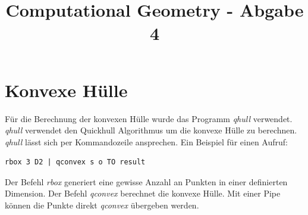 \documentclass[conference]{IEEEtran}
\begin{document}
	
	\title{Computational Geometry - Abgabe 4}
	
	\author{
	}
	
	\maketitle
	

	\section{Konvexe Hülle}
	Für die Berechnung der konvexen Hülle wurde das Programm \textit{qhull} \cite{b2} verwendet. \textit{qhull} verwendet den Quickhull Algorithmus um die konvexe Hülle zu berechnen. \textit{qhull} lässt sich per Kommandozeile ansprechen. Ein Beispiel für einen Aufruf:
	\begin{lstlisting}[basicstyle=\small]
	rbox 3 D2 | qconvex s o TO result
	\end{lstlisting}
	Der Befehl \textit{rbox} generiert eine gewisse Anzahl an Punkten in einer definierten Dimension. Der Befehl \textit{qconvex} berechnet die konvexe Hülle. Mit einer Pipe können die Punkte direkt \textit{qconvex} übergeben werden.\\
\end{document}
